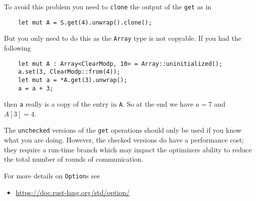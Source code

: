 To avoid this problem you need to \verb|clone| the output of the \verb|get| as in
\begin{lstlisting}
    let mut A = S.get(4).unwrap().clone();
\end{lstlisting}
But you only need to do this as the \verb|Array| type is not copyable.
If you had the following 
\begin{lstlisting}
    let mut A : Array<ClearModp, 10> = Array::uninitialized();
    a.set(3, ClearModp::from(4));
    let mut a = *A.get(3).unwrap();
    a = a + 3;
\end{lstlisting}
then \verb|a| really is a copy of the entry in \verb|A|. So
at the end we have $a=7$ and $A[3]=4$.

The \verb|unchecked| versions of the \verb|get| operations should only be
used if you know what you are doing. However, the checked versions do have
a performance cost; they require a run-time branch which may impact the
optimizers ability to reduce the total number of rounds of communication.

For more details on \verb|Option|s see
\begin{itemize}
        \item \url{https://doc.rust-lang.org/std/option/}
\end{itemize}





